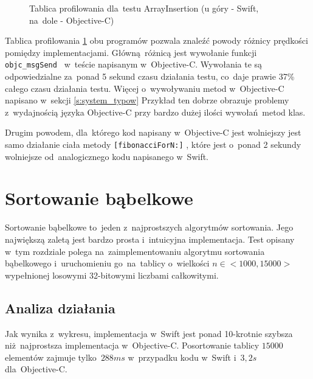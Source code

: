 \documentclass[mgr, shortabstract]{iithesis}
\newcommand{\objcinline}[1]{
    \texttt{#1}
}
\begin{document}
\begin{figure}
    \caption{Tablica profilowania dla~testu ArrayInsertion (u góry - Swift, na~dole - Objective-C)}
    \label{i:fibonacci}
\end{figure}

Tablica profilowania \ref{i:fibonacci} obu programów pozwala znaleźć powody różnicy prędkości pomiędzy implementacjami. Główną różnicą jest wywołanie funkcji \objcinline{objc_msgSend } w~teście napisanym w~Objective-C. Wywołania te są odpowiedzialne za~ponad 5 sekund czasu działania testu, co~daje prawie 37\% całego czasu działania testu. Więcej o~wywoływaniu metod w~Objective-C napisano w~sekcji \ref{s:system_typow} Przykład ten dobrze obrazuje problemy z~wydajnością języka Objective-C przy bardzo dużej ilości wywołań metod klas.

Drugim powodem, dla~którego kod napisany w~Objective-C jest wolniejszy jest samo działanie ciała metody \objcinline{[fibonacciForN:]}, które jest o~ponad 2 sekundy wolniejsze od~analogicznego kodu napisanego w~Swift.

\section{Sortowanie bąbelkowe}
Sortowanie bąbelkowe to~jeden z~najprostszych algorytmów sortowania. Jego największą zaletą jest bardzo prosta i~intuicyjna implementacja. Test opisany w~tym rozdziale polega na~zaimplementowaniu algorytmu sortowania bąbelkowego i~uruchomieniu go~na~tablicy o~wielkości $n \in <1000, 15000>$ wypełnionej losowymi 32-bitowymi liczbami całkowitymi.

\subsection{Analiza działania}

Jak wynika z~wykresu, implementacja w~Swift jest ponad 10-krotnie szybsza niż najprostsza implementacja w~Objective-C. Posortowanie tablicy $15000$ elementów zajmuje tylko~$288 ms$ w~przypadku kodu w~Swift i~$3,2 s$ dla~Objective-C.
\end{document}
